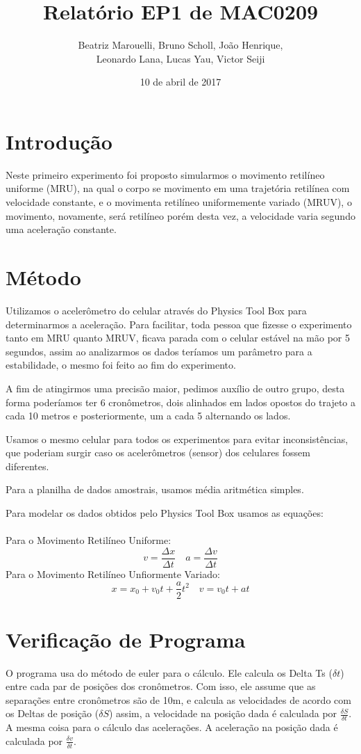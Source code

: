 \documentclass[a4paper, 12pt]{article}
\title{Relatório EP1 de MAC0209}
\author{Beatriz Marouelli, Bruno Scholl, João Henrique, 
\\ Leonardo Lana, Lucas Yau, Victor Seiji}
\date{10 de abril de 2017}
\begin{document}
\maketitle

\section*{Introdução}
Neste primeiro experimento foi proposto simularmos o movimento retilíneo
uniforme (MRU), na qual o corpo se movimento em uma trajetória retilínea com
velocidade constante, e o movimenta retilíneo uniformemente variado (MRUV),
o movimento, novamente, será retilíneo porém desta vez, a velocidade varia
segundo uma aceleração constante.

\section*{Método}
Utilizamos o acelerômetro do celular através do Physics Tool Box para
determinarmos a aceleração. Para facilitar, toda pessoa que fizesse o experimento 
tanto em MRU quanto MRUV, ficava parada com o celular estável na mão por 5 segundos, 
assim ao analizarmos os dados teríamos um parâmetro para a estabilidade, o mesmo 
foi feito ao fim do experimento.

A fim de atingirmos uma precisão maior, pedimos auxílio de outro grupo, desta
forma poderíamos ter 6 cronômetros, dois alinhados em lados opostos do trajeto
a cada 10 metros e posteriormente, um a cada 5 alternando os lados.

Usamos o mesmo celular para todos os experimentos para evitar inconsistências,
que poderiam surgir caso os acelerômetros (sensor) dos celulares fossem diferentes.

Para a planilha de dados amostrais, usamos média aritmética simples.

Para modelar os dados obtidos pelo Physics Tool Box usamos as equações: \\
\\
Para o Movimento Retilíneo Uniforme:
$$v = \frac{\Delta x}{\Delta t} \quad a = \frac{\Delta v}{\Delta t}$$
Para o Movimento Retilíneo Unfiormente Variado:
$$x = x_0 + v_0 t + \frac{a}{2} t^2 \quad v = v_0 t + at$$

\section*{Verificação de Programa}
O programa usa do método de euler para o cálculo. Ele calcula os Delta Ts
($\delta t$) entre cada par de posições dos cronômetros. Com isso, ele assume
que as separações entre cronômetros são de 10m, e calcula as velocidades de
acordo com os Deltas de posição ($\delta S$) assim, a velocidade na posição dada
é calculada por $\frac{\delta S}{\delta t}$.
A mesma coisa para o cálculo das acelerações. A aceleração na posição dada é
calculada por $\frac{\delta v}{\delta t}$.
\end{document}
